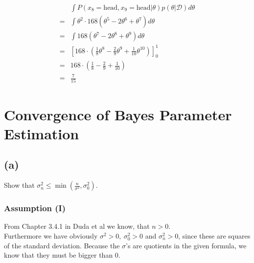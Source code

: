\documentclass{article}
\begin{document}
\begin{align}
\begin{aligned}
	& \int P(x_8 = \text{head}, x_9 = \text{head} | \theta) p(\theta|\mathcal{D}) d\theta\\
=	& \int \theta^2 \cdot 168(\theta^5 - 2 \theta ^6 + \theta^7) d\theta\\
=	& \int 168(\theta^7 - 2 \theta ^8 + \theta^9) d\theta\\
=	& \left[ 168 \cdot(\frac{1}{8}\theta^8 - \frac{2}{9} \theta ^9 + \frac{1}{10}\theta^{10}) \right]_0^1\\
=	& 168 \cdot (\frac{1}{8} - \frac{2}{9} + \frac{1}{10})\\
=	& \frac{7}{15}
\end{aligned}
\end{align}


\section{Convergence of Bayes Parameter Estimation}

\subsection*{(a)}
Show that $ \sigma^2_n \leq \min \left (\frac{n}{\sigma^2},\sigma^2_0 \right )$.
\subsubsection*{Assumption (I)}
From Chapter 3.4.1 in Duda et al we know, that $n > 0$.\\
Furthermore we have obviously $\sigma^2 > 0, ~\sigma^2_0 > 0$ and $\sigma^2_n > 0$, since these are squares of the standard deviation. Because the $\sigma$'s are quotients in the given formula, we know that they must be bigger than $0$.\\
\end{document}
